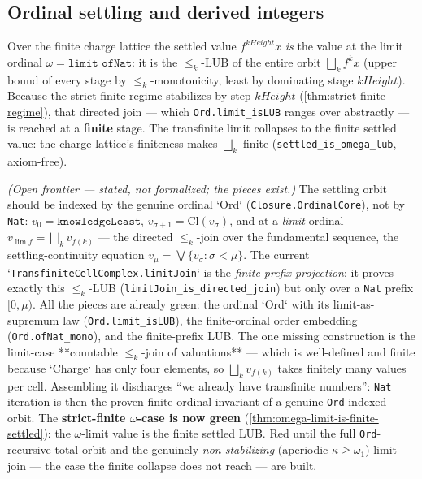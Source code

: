 \subsection{Ordinal settling and derived integers}

\begin{theorem}\label{thm:omega-limit-is-finite-settled}\leanok{}
Over the finite charge lattice the settled value $f^{kHeight}x$ \emph{is} the value at the limit
ordinal $\omega = \texttt{limit ofNat}$: it is the $\le_k$-LUB of the entire orbit
$\bigsqcup_k f^k x$ (upper bound of every stage by $\le_k$-monotonicity, least by dominating stage
$kHeight$). Because the strict-finite regime stabilizes by step $kHeight$
(\cref{thm:strict-finite-regime}), that directed join --- which \texttt{Ord.limit\_isLUB} ranges
over abstractly --- is reached at a \textbf{finite} stage. The transfinite limit collapses to the
finite settled value: the charge lattice's finiteness makes $\bigsqcup_k$ finite
(\texttt{settled\_is\_omega\_lub}, axiom-free).
\end{theorem}

\begin{theorem}\label{thm:ordinal-indexed-settling-orbit}\notready{}
\emph{(Open frontier --- stated, not formalized; the pieces exist.)} The settling orbit should be
indexed by the genuine ordinal `Ord` (\texttt{Closure.OrdinalCore}), not by \texttt{Nat}:
$v_0 = \texttt{knowledgeLeast}$, $v_{\sigma+1} = \mathrm{Cl}(v_\sigma)$, and at a \emph{limit}
ordinal $v_{\lim f} = \bigsqcup_k v_{f(k)}$ --- the directed $\le_k$-join over the fundamental
sequence, the settling-continuity equation $v_\mu = \bigvee\{v_\sigma : \sigma<\mu\}$.
The current `\texttt{TransfiniteCellComplex.limitJoin}` is the \emph{finite-prefix projection}: it
proves exactly this $\le_k$-LUB (\texttt{limitJoin\_is\_directed\_join}) but only over a
\texttt{Nat} prefix $[0,\mu)$. All the pieces are already green: the ordinal `Ord` with its
limit-as-supremum law (\texttt{Ord.limit\_isLUB}), the finite-ordinal order embedding
(\texttt{Ord.ofNat\_mono}), and the finite-prefix LUB. The one missing construction is the
limit-case **countable $\le_k$-join of valuations** --- which is well-defined and finite because
`Charge` has only four elements, so $\bigsqcup_k v_{f(k)}$ takes finitely many values per cell.
Assembling it discharges ``we already have transfinite numbers'': \texttt{Nat} iteration is then
the proven finite-ordinal invariant of a genuine \texttt{Ord}-indexed orbit. The
\textbf{strict-finite $\omega$-case is now green} (\cref{thm:omega-limit-is-finite-settled}): the
$\omega$-limit value is the finite settled LUB. Red until the full \texttt{Ord}-recursive total
orbit and the genuinely \emph{non-stabilizing} (aperiodic $\kappa\ge\omega_1$) limit join --- the
case the finite collapse does not reach --- are built.
\end{theorem}

